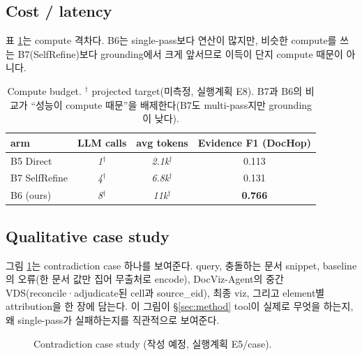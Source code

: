 \documentclass[11pt]{article}
\newcommand{\proj}[1]{\textit{#1}$^\dagger$} %
\begin{document}
\subsection{Cost / latency}
\label{sec:cost}
표 \ref{tab:cost}는 compute 격차다. B6는 single-pass보다 연산이 많지만, 비슷한 compute를 쓰는
B7(SelfRefine)보다 grounding에서 크게 앞서므로 이득이 단지 compute 때문이 아니다.

\begin{table}[h]
\centering\small
\begin{tabular}{lccc}
\toprule
arm & LLM calls & avg tokens & Evidence F1 (DocHop) \\
\midrule
B5 Direct & \proj{1} & \proj{2.1k} & 0.113 \\
B7 SelfRefine & \proj{4} & \proj{6.8k} & 0.131 \\
B6 (ours) & \proj{8} & \proj{11k} & \textbf{0.766} \\
\bottomrule
\end{tabular}
\caption{Compute budget. $^\dagger$ projected target(미측정, 실행계획 E8). B7과 B6의 비교가
``성능이 compute 때문''을 배제한다(B7도 multi-pass지만 grounding이 낮다).}
\label{tab:cost}
\end{table}

\subsection{Qualitative case study}
\label{sec:case}
그림 \ref{fig:case}는 contradiction case 하나를 보여준다. query, 충돌하는 문서 snippet, baseline의
오류(한 문서 값만 집어 무출처로 encode), DocViz-Agent의 중간 VDS(reconcile·adjudicate된 cell과
source\_eid), 최종 viz, 그리고 element별 attribution을 한 장에 담는다. 이 그림이 \S\ref{sec:method}
tool이 실제로 무엇을 하는지, 왜 single-pass가 실패하는지를 직관적으로 보여준다.

\begin{figure}[h]
\centering
{}
\caption{Contradiction case study (작성 예정, 실행계획 E5/case).}
\label{fig:case}
\end{figure}

\end{document}

